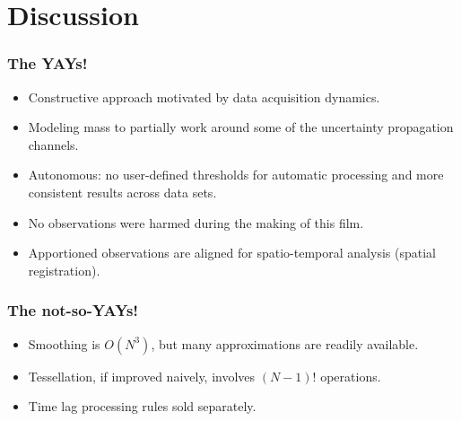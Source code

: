 \documentclass{beamer}
\begin{document}

\section{Discussion}

\begin{frame}[t]
  \frametitle{The YAYs!}


  \begin{itemize}
    \item<2-> Constructive approach motivated by data acquisition
      dynamics.
    \item<3-> Modeling mass to partially work around some of the
      uncertainty propagation channels.
    \item<4-> Autonomous: no user-defined thresholds for automatic
      processing and more consistent results across data sets.
    \item<5-> No observations were harmed during the making of this film.
    \item<6-> Apportioned observations are aligned for spatio-temporal
      analysis (spatial registration).
  \end{itemize}
  
\end{frame}

\begin{frame}[t]
  \frametitle{The not-so-YAYs!}


  \begin{itemize}
    \item<2-> Smoothing is $O(N^3)$, but many approximations are
      readily available.
    \item<3-> Tessellation, if improved naively, involves $(N-1)!$ operations.
    \item<4-> Time lag processing rules sold separately.
  \end{itemize}
  
\end{frame}

\end{document}
